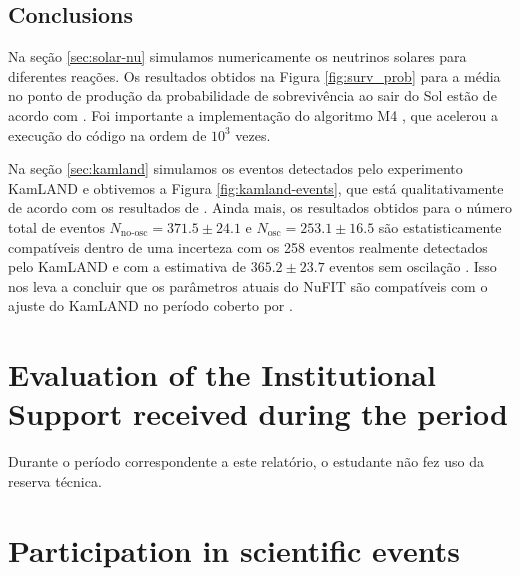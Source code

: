 \documentclass[12pt]{report}
\begin{document}
\section{Conclusions}

Na seção \ref{sec:solar-nu} simulamos numericamente os neutrinos solares para diferentes reações. Os resultados obtidos na Figura \ref{fig:surv_prob} para a média no ponto de produção da probabilidade de sobrevivência ao sair do Sol estão de acordo com \cite{winslow}. Foi importante a implementação do algoritmo M4 \cite{efficient-nu}, que acelerou a execução do código na ordem de $10^3$ vezes.


Na seção \ref{sec:kamland} simulamos os eventos detectados pelo experimento KamLAND e obtivemos a Figura \ref{fig:kamland-events}, que está qualitativamente de acordo com os resultados de \cite{spectral-distortion}. Ainda mais, os resultados obtidos para o número total de eventos $N_{\text{no-osc}} = 371.5 \pm 24.1$ e $N_{\text{osc}} = 253.1 \pm 16.5$ são estatisticamente compatíveis dentro de uma incerteza com os 258 eventos realmente detectados pelo KamLAND e com a estimativa de $365.2 \pm 23.7$ eventos sem oscilação \cite{spectral-distortion}. Isso nos leva a concluir que os parâmetros atuais do NuFIT \cite{nufit} são compatíveis com o ajuste do KamLAND no período coberto por \cite{spectral-distortion}.



\chapter{Evaluation of the Institutional Support received during the period} \label{chp:apoioInst}

Durante o período correspondente a este relatório, o estudante não fez uso da reserva técnica.



\chapter{Participation in scientific events} \label{chp:particEvento}
\end{document}
